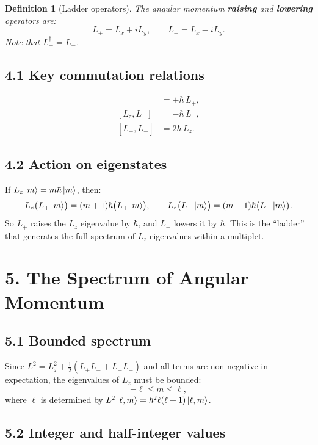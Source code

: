 \documentclass[12pt,a4paper]{article}
\newtheorem{definition}{Definition}
\begin{document}
\begin{definition}[Ladder operators]
The angular momentum \textbf{raising} and \textbf{lowering} operators are:
\[
    L_+ = L_x + iL_y, \qquad L_- = L_x - iL_y.
\]
Note that $L_+^\dagger = L_-$.
\end{definition}

\subsection{4.1 Key commutation relations}

\begin{align}
    [L_z, L_+] &= +\hbar\, L_+, \\
    [L_z, L_-] &= -\hbar\, L_-, \\
    [L_+, L_-] &= 2\hbar\, L_z.
\end{align}

\subsection{4.2 Action on eigenstates}

If $L_z\ket{m} = m\hbar\ket{m}$, then:
\[
    L_z\bigl(L_+\ket{m}\bigr) = (m+1)\hbar\bigl(L_+\ket{m}\bigr), \qquad
    L_z\bigl(L_-\ket{m}\bigr) = (m-1)\hbar\bigl(L_-\ket{m}\bigr).
\]
So $L_+$ raises the $L_z$ eigenvalue by $\hbar$, and $L_-$ lowers it by $\hbar$.  This is the ``ladder'' that generates the full spectrum of $L_z$ eigenvalues within a multiplet.

\section{5. The Spectrum of Angular Momentum}

\subsection{5.1 Bounded spectrum}

Since $L^2 = L_z^2 + \tfrac{1}{2}(L_+L_- + L_-L_+)$ and all terms are non-negative in expectation, the eigenvalues of $L_z$ must be bounded:
\[
    -\ell \leq m \leq \ell,
\]
where $\ell$ is determined by $L^2\ket{\ell, m} = \hbar^2\ell(\ell+1)\ket{\ell, m}$.

\subsection{5.2 Integer and half-integer values}
\end{document}
